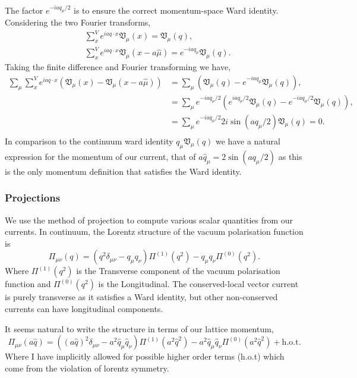 The factor $e^{-iaq_\mu/2}$ is to ensure the correct momentum-space Ward identity.
Considering the two Fourier transforms,
\begin{equation}
\begin{aligned}
&\sum_{x}^{V}e^{iaq\cdot x}\mathfrak{V}_{\mu}(x) = \mathfrak{V}_{\mu}(q), \\
&\sum_{x}^{V}e^{iaq\cdot x}\mathfrak{V}_{\mu}(x-a\hat{\mu}) = e^{-iaq_\mu}\mathfrak{V}_{\mu}(q).
\end{aligned}
\end{equation}
Taking the finite difference and Fourier transforming we have,
\begin{equation}
\begin{aligned}
\sum_{\mu}\sum_{x}^{V}e^{iaq\cdot x}\left( \mathfrak{V}_{\mu}(x)- \mathfrak{V}_{\mu}(x-a\hat{\mu}) \right) &= \sum_\mu \left( \mathfrak{V}_{\mu}(q) - e^{-iaq_\mu}\mathfrak{V}_{\mu}(q) \right), \\
&= \sum_\mu e^{-iaq_\mu/2}\left( e^{iaq_\mu /2}\mathfrak{V}_{\mu}(q) - e^{-iaq_\mu /2}\mathfrak{V}_{\mu}(q) \right),\\
&= \sum_\mu e^{-iaq_\mu/2} 2i \sin( aq_\mu / 2 )\mathfrak{V}_{\mu}(q) = 0.\\
\end{aligned}
\end{equation}
In comparison to the continuum ward identity $q_\mu \mathfrak{V}_\mu(q)$ we have a natural
expression for the momentum of our current, that of $a\hat{q}_\mu = 2 \sin( aq_\mu / 2 )$ as
this is the only momentum definition that satisfies the Ward identity.

\subsubsection{Projections}

We use the method of projection to compute various scalar quantities from our currents.
In continuum, the Lorentz structure of the vacuum polarisation function is
\begin{equation}
\Pi_{\mu\nu}(q) = \left( q^2 \delta_{\mu\nu} - q_\mu q_\nu \right)\Pi^{(1)}(q^2) - q_\mu q_\nu \Pi^{(0)}(q^2).
\end{equation}
Where $\Pi^{(1)}(q^2)$ is the Transverse component of the vacuum polarisation function
and $\Pi^{(0)}(q^2)$ is the Longitudinal. The conserved-local vector current is purely
transverse as it satisfies a Ward identity, but other non-conserved currents can have
longitudinal components.

It seems natural to write the structure in terms of our lattice momentum,
\begin{equation}
\Pi_{\mu\nu}(a\hat{q}) = \left( \left(a\hat{q}\right)^2 \delta_{\mu\nu} - a^2\hat{q}_\mu \hat{q}_\nu \right)\Pi^{(1)}(a^2\hat{q}^2) - a^2\hat{q}_\mu \hat{q}_\nu \Pi^{(0)}(a^2\hat{q}^2) + \text{h.o.t}.
\end{equation}
Where I have implicitly allowed for possible higher order terms (h.o.t) which come from
the violation of lorentz symmetry.

